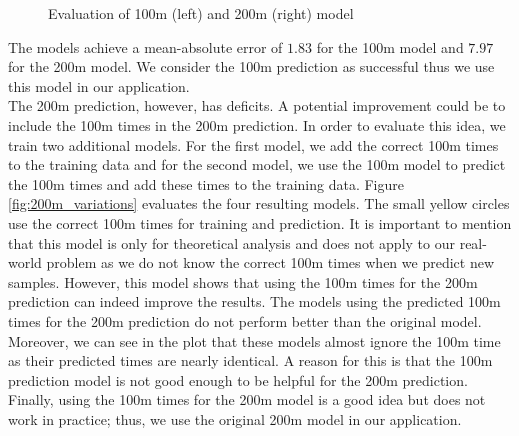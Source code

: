 \begin{figure}[ht]
\begin{minipage}{0.23\textwidth}
\end{minipage}
\caption{Evaluation of 100m (left) and 200m (right) model}
\label{fig:eval_model}
\end{figure}
The models achieve a mean-absolute error of $1.83$ for the 100m model and $7.97$ for the 200m model. We consider the 100m prediction as successful thus we use this model in our application.\\
The 200m prediction, however, has deficits. A potential improvement could be to include the 100m times in the 200m prediction. In order to evaluate this idea, we train two additional models. For the first model, we add the correct 100m times to the training data and for the second model, we use the 100m model to predict the 100m times and add these times to the training data. Figure \ref{fig:200m_variations} evaluates the four resulting models. The small yellow circles use the correct 100m times for training and prediction. It is important to mention that this model is only for theoretical analysis and does not apply to our real-world problem as we do not know the correct 100m times when we predict new samples. However, this model shows that using the 100m times for the 200m prediction can indeed improve the results. The models using the predicted 100m times for the 200m prediction do not perform better than the original model. Moreover, we can see in the plot that these models almost ignore the 100m time as their predicted times are nearly identical. A reason for this is that the 100m prediction model is not good enough to be helpful for the 200m prediction. Finally, using the 100m times for the 200m model is a good idea but does not work in practice; thus, we use the original 200m model in our application.